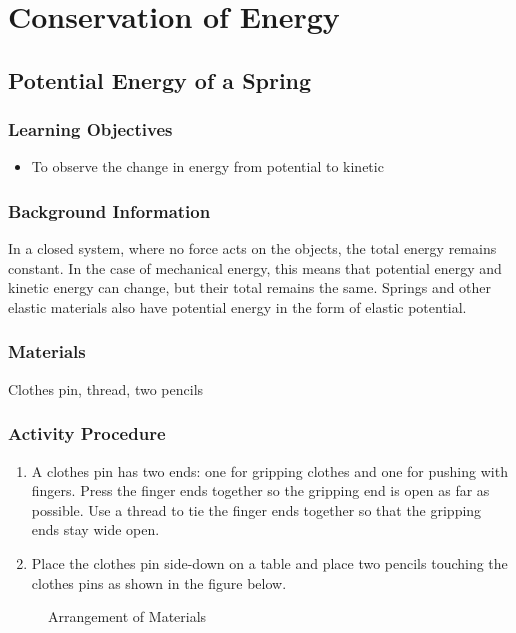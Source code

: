\section{Conservation of Energy}

\subsection{Potential Energy of a Spring}

\subsubsection*{Learning Objectives}
\begin{itemize}
\item{To observe the change in energy from potential to kinetic}
\end{itemize}

\subsubsection*{Background Information}
In a closed system, where no force acts on the objects, the total energy remains constant.  In the case of mechanical energy, this means that potential energy and kinetic energy can change, but their total remains the same.  Springs and other elastic materials also have potential energy in the form of elastic potential.

\subsubsection{Materials} 
Clothes pin, thread, two pencils\\

\subsubsection{Activity Procedure}
\begin{enumerate}
\item{A clothes pin has two ends: one for gripping clothes and one for pushing with fingers. Press the finger ends together so the gripping end is open as far as possible. Use a thread to tie the finger ends together so that the gripping ends stay wide open.}
\item{Place the clothes pin side-down on a table and place two pencils touching the clothes pins as shown in the figure below.}

\end{enumerate}
\begin{figure}[h]
\begin{center}
\def\svgwidth{200pt}

\caption{Arrangement of Materials}
\label{fig:energy-conservation}
\end{center}
\end{figure}

